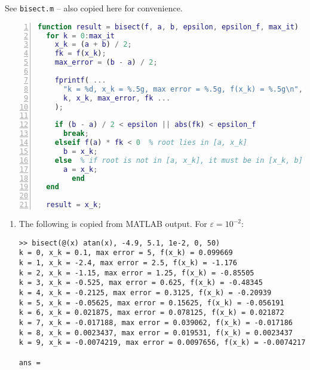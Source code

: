 \documentclass{homework}
\begin{document}
\maketitle

\question
\begin{alphaparts}
	\questionpart See \verb*|bisect.m| -- also copied here for convenience.
	\begin{lstlisting}[language=MATLAB, numbers=left, frame=single, basicstyle=\small\ttfamily]
function result = bisect(f, a, b, epsilon, epsilon_f, max_it)
  for k = 0:max_it
    x_k = (a + b) / 2;
    fk = f(x_k);
    max_error = (b - a) / 2;

    fprintf( ...
      "k = %d, x_k = %.5g, max error = %.5g, f(x_k) = %.5g\n", ...
      k, x_k, max_error, fk ...
    );

    if (b - a) / 2 < epsilon || abs(fk) < epsilon_f
      break;
    elseif f(a) * fk < 0  % root lies in [a, x_k]
      b = x_k;
    else  % if root is not in [a, x_k], it must be in [x_k, b]
      a = x_k;
     	end
  end

  result = x_k;
	\end{lstlisting}
	\questionpart \begin{enumerate}[label=\textbf{(\arabic*)}]
		\item The following is copied from MATLAB output. For $\varepsilon = 10^{-2}$:
		\begin{lstlisting}[basicstyle=\small\ttfamily, frame=single]
>> bisect(@(x) atan(x), -4.9, 5.1, 1e-2, 0, 50)
k = 0, x_k = 0.1, max error = 5, f(x_k) = 0.099669
k = 1, x_k = -2.4, max error = 2.5, f(x_k) = -1.176
k = 2, x_k = -1.15, max error = 1.25, f(x_k) = -0.85505
k = 3, x_k = -0.525, max error = 0.625, f(x_k) = -0.48345
k = 4, x_k = -0.2125, max error = 0.3125, f(x_k) = -0.20939
k = 5, x_k = -0.05625, max error = 0.15625, f(x_k) = -0.056191
k = 6, x_k = 0.021875, max error = 0.078125, f(x_k) = 0.021872
k = 7, x_k = -0.017188, max error = 0.039062, f(x_k) = -0.017186
k = 8, x_k = 0.0023437, max error = 0.019531, f(x_k) = 0.0023437
k = 9, x_k = -0.0074219, max error = 0.0097656, f(x_k) = -0.0074217

ans =


\end{lstlisting}
\end{enumerate}
\end{alphaparts}
\end{document}

